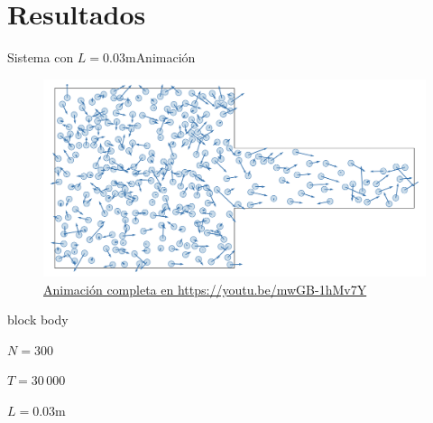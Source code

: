 \documentclass{beamer}
\begin{document}
\section{Resultados}
\begin{frame}{Sistema con $L=0.03$m}{Animación}
    \begin{figure}[H!]
        \includegraphics[height=.50\textheight]{resources/animacion-L003.png}
        \caption*{\href{https://youtu.be/mwGB-1hMv7Y}{Animación completa en https://youtu.be/mwGB-1hMv7Y}}
        \label{animacion-eta-0.1}
    \end{figure}
    \begin{beamercolorbox}[sep=5pt,center]{block body}
        \begin{minipage}[t]{0.3\textwidth}
            \centering
            \small{$N=300$}
        \end{minipage}
        \hfill
        \begin{minipage}[t]{0.3\textwidth}
            \centering
            \small{$T=30\,000$}
        \end{minipage}
        \hfill
        \begin{minipage}[t]{0.3\textwidth}
            \centering
            \small{$L = 0.03$m}
        \end{minipage}
    \end{beamercolorbox}
\end{frame}
\end{document}
